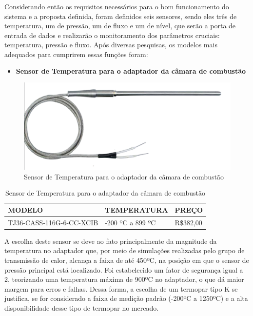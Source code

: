 Considerando então os requisitos necessários para o bom funcionamento do sistema e a proposta definida, foram definidos seis sensores, sendo eles três de temperatura, um de pressão, um de fluxo e um de nível, que serão a porta de entrada de dados e realizarão o monitoramento dos parâmetros cruciais: temperatura, pressão e fluxo. Após diversas pesquisas, os modelos mais adequados para cumprirem essas funções foram:
\newpage
\begin{itemize}
    \item \textbf{Sensor de Temperatura para o adaptador da câmara de combustão}
\end{itemize}
\begin{figure}[!htb]                  
	\centering                          
	\includegraphics[scale=0.5]{figuras/Sensor1.eps}
	\caption{ Sensor de Temperatura para o adaptador da câmara de combustão } \label{figsensor1}        
\end{figure}

\begin{table}[!h]
    \centering
    \begin{tabular}{|p{5cm}|p{5cm}|p{5cm}|}
    \hline
    \textbf{MODELO} & \textbf{TEMPERATURA}    & \textbf{PREÇO}  \\ \hline
    TJ36-CASS-116G-6-CC-XCIB      & -200 ºC a 899 ºC &  R\$382,00  \\ \hline
    \end{tabular}
    \caption{Sensor de Temperatura para o adaptador da câmara de combustão}
    \end{table}

A escolha deste sensor se deve ao fato principalmente da magnitude da temperatura no adaptador que, por meio de simulações realizadas pelo grupo de transmissão de calor, alcança a faixa de até 450ºC, na posição em que o sensor de pressão principal está localizado. Foi estabelecido um fator de segurança igual a 2, teorizando uma temperatura máxima de 900ºC no adaptador, o que dá maior margem para erros e falhas. Dessa forma, a escolha de um termopar tipo K se justifica, se for considerado a faixa de medição padrão (-200ºC a 1250ºC) e a alta disponibilidade desse tipo de termopar no mercado.

